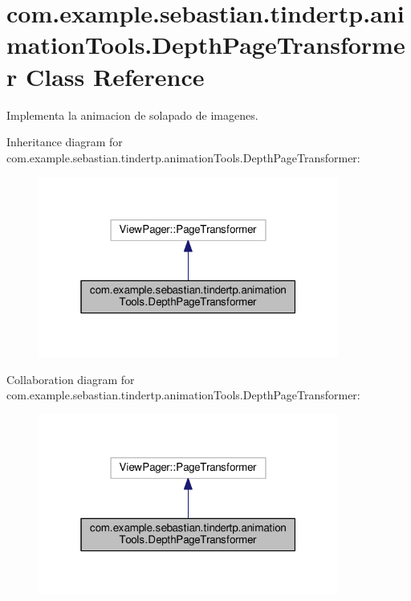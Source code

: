 \hypertarget{classcom_1_1example_1_1sebastian_1_1tindertp_1_1animationTools_1_1DepthPageTransformer}{}\section{com.\+example.\+sebastian.\+tindertp.\+animation\+Tools.\+Depth\+Page\+Transformer Class Reference}
\label{classcom_1_1example_1_1sebastian_1_1tindertp_1_1animationTools_1_1DepthPageTransformer}


Implementa la animacion de solapado de imagenes.  




Inheritance diagram for com.\+example.\+sebastian.\+tindertp.\+animation\+Tools.\+Depth\+Page\+Transformer\+:\nopagebreak
\begin{figure}[H]
\begin{center}
\leavevmode
\includegraphics[width=280pt]{classcom_1_1example_1_1sebastian_1_1tindertp_1_1animationTools_1_1DepthPageTransformer__inherit__graph}
\end{center}
\end{figure}


Collaboration diagram for com.\+example.\+sebastian.\+tindertp.\+animation\+Tools.\+Depth\+Page\+Transformer\+:\nopagebreak
\begin{figure}[H]
\begin{center}
\leavevmode
\includegraphics[width=280pt]{classcom_1_1example_1_1sebastian_1_1tindertp_1_1animationTools_1_1DepthPageTransformer__coll__graph}
\end{center}
\end{figure}
